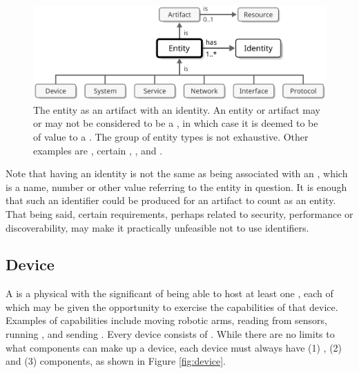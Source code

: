 \begin{figure}[ht!]
  \centering
  \includegraphics[scale=0.9]{figures/entity}
  \caption{
    The entity as an artifact with an identity.
    An entity or artifact may or may not be considered to be a , in which case it is deemed to be of value to a .
    The group of entity types is not exhaustive.
    Other examples are , certain , ,  and .
  }
  \label{fig:entity}
\end{figure}

\vspace*{0.9mm}

Note that having an identity is not the same as being associated with an , which is a name, number or other value referring to the entity in question.
It is enough that such an identifier could be produced for an artifact to count as an entity.
That being said, certain  requirements, perhaps related to security, performance or discoverability, may make it practically unfeasible not to use identifiers.

\subsection{Device}
\label{sec:concepts:device}

A  is a physical  with the significant  of being able to host at least one , each of which may be given the opportunity to exercise the capabilities of that device.
Examples of capabilities include moving robotic arms, reading from sensors, running , and sending . 
Every device consists of .
While there are no limits to what components can make up a device, each device must always have (1) , (2)  and (3)  components, as shown in Figure \ref{fig:device}.

